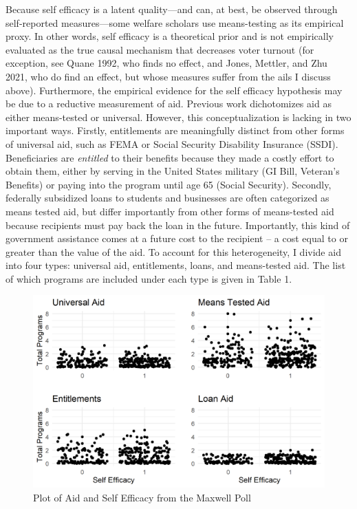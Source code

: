 \documentclass[12pt]{paper}
\begin{document}
Because self efficacy is a latent quality—and can, at best, be observed through self-reported measures—some welfare scholars use means-testing as its empirical proxy. In other words, self efficacy is a theoretical prior and is not empirically evaluated as the true causal mechanism that decreases voter turnout (for exception, see Quane 1992, who finds no effect, and Jones, Mettler, and Zhu 2021, who do find an effect, but whose measures suffer from the ails I discuss above). Furthermore, the empirical evidence for the self efficacy hypothesis may be due to a reductive measurement of aid. Previous work dichotomizes aid as either means-tested or universal. However, this conceptualization is lacking in two important ways. Firstly, entitlements are meaningfully distinct from other forms of universal aid, such as FEMA or Social Security Disability Insurance (SSDI). Beneficiaries are \textit{entitled} to their benefits because they made a costly effort to obtain them, either by serving in the United States military (GI Bill, Veteran's Benefits) or paying into the program until age 65 (Social Security). Secondly, federally subsidized loans to students and businesses are often categorized as means tested aid, but differ importantly from other forms of means-tested aid because recipients must pay back the loan in the future. Importantly, this kind of government assistance comes at a future cost to the recipient – a cost equal to or greater than the value of the aid. To account for this heterogeneity, I divide aid into four types: universal aid, entitlements, loans, and means-tested aid. The list of which programs are included under each type is given in Table 1.

\begin{figure} \centering
	\includegraphics[width=.8\linewidth]{Figs/scatter_SE.png}
	\caption{Plot of Aid and Self Efficacy from the Maxwell Poll}
	\label{}
\end{figure}
\end{document}
